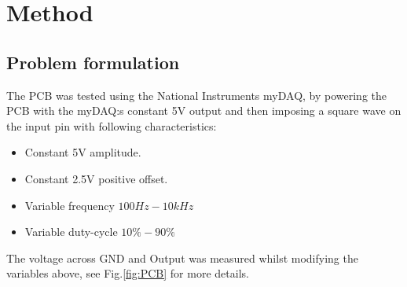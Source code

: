 \section{Method}
\subsection{Problem formulation}
The PCB was tested using the National Instruments myDAQ, by powering the PCB with the myDAQ:s constant 5V output and then imposing a square wave on the input pin with following characteristics:
\begin{itemize}
        \item Constant 5V amplitude.
        \item Constant 2.5V positive offset.
        \item Variable frequency $100Hz-10kHz$
        \item Variable duty-cycle $10\% - 90\%$
\end{itemize}
The voltage across GND and Output was measured whilst modifying the variables above, see Fig.\ref{fig:PCB} for more details.

